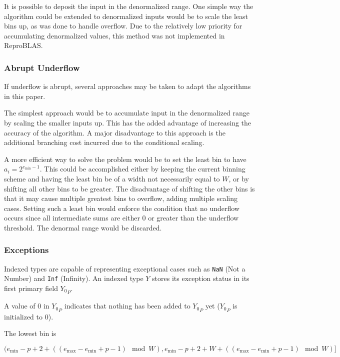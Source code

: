 \documentclass[12pt]{article}
\providecommand{\min}{\ensuremath{\text{min}}}
\providecommand{\max}{\ensuremath{\text{max}}}
\theoremstyle{plain}
\numberwithin{equation}{section}
\begin{document}
      It is possible to deposit the input in the denormalized range. One simple way the algorithm could be extended to denormalized inputs would be to scale the least bins up, as was done to handle overflow. Due to the relatively low priority for accumulating denormalized values, this method was not implemented in ReproBLAS.

    \subsubsection{Abrupt Underflow}
      \label{sec:indexed_implementation_underflow_abrupt}
      If underflow is abrupt, several approaches may be taken to adapt the algorithms in this paper.

      The simplest approach would be to accumulate input in the denormalized range by scaling the smaller inputs up. This has the added advantage of increasing the accuracy of the algorithm. A major disadvantage to this approach is the additional branching cost incurred due to the conditional scaling.

      A more efficient way to solve the problem would be to set the least bin to have $a_i = 2^{e_{\min} - 1}$. This could be accomplished either by keeping the current binning scheme and having the least bin be of a width not necessarily equal to $W$, or by shifting all other bins to be greater. The disadvantage of shifting the other bins is that it may cause multiple greatest bins to overflow, adding multiple scaling cases. Setting such a least bin would enforce the condition that no underflow occurs since all intermediate sums are either $0$ or greater than the underflow threshold. The denormal range would be discarded.

    \subsubsection{Exceptions}
      \label{sec:indexed_implementation_exceptions}
      Indexed types are capable of representing exceptional cases such as \verb|NaN| (Not a Number) and \verb|Inf| (Infinity). An indexed type $Y$ stores its exception status in its first primary field ${Y_0}_P$.

      A value of $0$ in ${Y_0}_P$ indicates that nothing has been added to ${Y_0}_P$ yet (${Y_0}_P$ is initialized to $0$).

      The lowest bin is

      \begin{equation*}
      (e_{\min} - p + 2 + ((e_{\max} - e_{\min} + p - 1 ) \mod W), e_{\min} - p + 2 + W + ((e_{\max} - e_{\min} + p - 1)\mod W)]
      \end{equation*}
\end{document}
